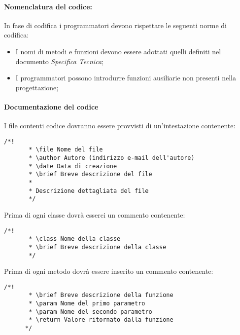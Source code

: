 \paragraph{Nomenclatura del codice:}
In fase di codifica i programmatori devono rispettare le seguenti norme di codifica:
\begin{itemize}
\item I nomi di metodi e funzioni devono essere adottati quelli definiti nel documento \emph{Specifica Tecnica};
\item I programmatori possono introdurre funzioni ausiliarie non presenti nella progettazione;
\end{itemize}   
     
   
   \paragraph{Documentazione del codice}
     I file contenti codice dovranno essere provvisti di un'intestazione contenente:
     \begin{lstlisting}[frame=single]
       /*!
       * \file Nome del file
       * \author Autore (indirizzo e-mail dell'autore)
       * \date Data di creazione
       * \brief Breve descrizione del file
       *
       * Descrizione dettagliata del file
       */
     \end{lstlisting}
     Prima di ogni classe dovrà esserci un commento contenente:
     \begin{lstlisting}[frame=single]
       /*!
       * \class Nome della classe
       * \brief Breve descrizione della classe
       */
     \end{lstlisting}
     Prima di ogni metodo dovrà essere inserito un commento contenente:
     \begin{lstlisting}[frame=single]
       /*!
       * \brief Breve descrizione della funzione
       * \param Nome del primo parametro
       * \param Nome del secondo parametro
       * \return Valore ritornato dalla funzione
      */
  \end{lstlisting}
      